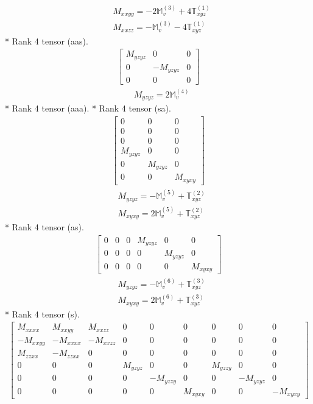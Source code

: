 \documentclass[fleqn,8pt,landscape]{jsarticle}
\begin{document}
\begin{align*}
& M_{xxyy} = - 2 \mathbb{M}_{v}^{(3)} + 4 \mathbb{T}_{xyz}^{(1)} \\
& M_{xxzz} = - \mathbb{M}_{v}^{(3)} - 4 \mathbb{T}_{xyz}^{(1)}
\end{align*}
* Rank 4 tensor (aas).
\begin{align*}
\begin{bmatrix} M_{yzyz} & 0 & 0 \\ 0 & - M_{yzyz} & 0 \\ 0 & 0 & 0 \end{bmatrix}
\end{align*}
\begin{align*}
& M_{yzyz} = 2 \mathbb{M}_{v}^{(4)}
\end{align*}
* Rank 4 tensor (aaa).
* Rank 4 tensor (sa).
\begin{align*}
\begin{bmatrix} 0 & 0 & 0 \\ 0 & 0 & 0 \\ 0 & 0 & 0 \\ M_{yzyz} & 0 & 0 \\ 0 & M_{yzyz} & 0 \\ 0 & 0 & M_{xyxy} \end{bmatrix}
\end{align*}
\begin{align*}
& M_{yzyz} = - \mathbb{M}_{v}^{(5)} + \mathbb{T}_{xyz}^{(2)} \\
& M_{xyxy} = 2 \mathbb{M}_{v}^{(5)} + \mathbb{T}_{xyz}^{(2)}
\end{align*}
* Rank 4 tensor (as).
\begin{align*}
\begin{bmatrix} 0 & 0 & 0 & M_{yzyz} & 0 & 0 \\ 0 & 0 & 0 & 0 & M_{yzyz} & 0 \\ 0 & 0 & 0 & 0 & 0 & M_{xyxy} \end{bmatrix}
\end{align*}
\begin{align*}
& M_{yzyz} = - \mathbb{M}_{v}^{(6)} + \mathbb{T}_{xyz}^{(3)} \\
& M_{xyxy} = 2 \mathbb{M}_{v}^{(6)} + \mathbb{T}_{xyz}^{(3)}
\end{align*}
* Rank 4 tensor (s).
\begin{align*}
\begin{bmatrix} M_{xxxx} & M_{xxyy} & M_{xxzz} & 0 & 0 & 0 & 0 & 0 & 0 \\ - M_{xxyy} & - M_{xxxx} & - M_{xxzz} & 0 & 0 & 0 & 0 & 0 & 0 \\ M_{zzxx} & - M_{zzxx} & 0 & 0 & 0 & 0 & 0 & 0 & 0 \\ 0 & 0 & 0 & M_{yzyz} & 0 & 0 & M_{yzzy} & 0 & 0 \\ 0 & 0 & 0 & 0 & - M_{yzzy} & 0 & 0 & - M_{yzyz} & 0 \\ 0 & 0 & 0 & 0 & 0 & M_{xyxy} & 0 & 0 & - M_{xyxy} \end{bmatrix}
\end{align*}
\end{document}
